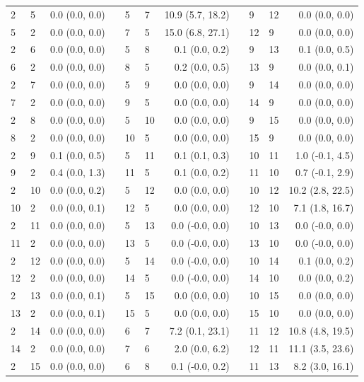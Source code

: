 \begin{xltabular}{\textwidth}{llrp{0.2cm}llrp{0.2cm}llr}
    2 & 5 & 0.0 (0.0, 0.0) & & 5 & 7 & 10.9 (5.7, 18.2) & & 9 & 12 & 0.0 (0.0, 0.0) \\
    5 & 2 & 0.0 (0.0, 0.0) & & 7 & 5 & 15.0 (6.8, 27.1) & & 12 & 9 & 0.0 (0.0, 0.0) \\
    2 & 6 & 0.0 (0.0, 0.0) & & 5 & 8 & 0.1 (0.0, 0.2) & & 9 & 13 & 0.1 (0.0, 0.5) \\
    6 & 2 & 0.0 (0.0, 0.0) & & 8 & 5 & 0.2 (0.0, 0.5) & & 13 & 9 & 0.0 (0.0, 0.1) \\
    2 & 7 & 0.0 (0.0, 0.0) & & 5 & 9 & 0.0 (0.0, 0.0) & & 9 & 14 & 0.0 (0.0, 0.0) \\
    7 & 2 & 0.0 (0.0, 0.0) & & 9 & 5 & 0.0 (0.0, 0.0) & & 14 & 9 & 0.0 (0.0, 0.0) \\
    2 & 8 & 0.0 (0.0, 0.0) & & 5 & 10 & 0.0 (0.0, 0.0) & & 9 & 15 & 0.0 (0.0, 0.0) \\
    8 & 2 & 0.0 (0.0, 0.0) & & 10 & 5 & 0.0 (0.0, 0.0) & & 15 & 9 & 0.0 (0.0, 0.0) \\
    2 & 9 & 0.1 (0.0, 0.5) & & 5 & 11 & 0.1 (0.1, 0.3) & & 10 & 11 & 1.0 (-0.1, 4.5) \\
    9 & 2 & 0.4 (0.0, 1.3) & & 11 & 5 & 0.1 (0.0, 0.2) & & 11 & 10 & 0.7 (-0.1, 2.9) \\
    2 & 10 & 0.0 (0.0, 0.2) & & 5 & 12 & 0.0 (0.0, 0.0) & & 10 & 12 & 10.2 (2.8, 22.5) \\
    10 & 2 & 0.0 (0.0, 0.1) & & 12 & 5 & 0.0 (0.0, 0.0) & & 12 & 10 & 7.1 (1.8, 16.7) \\
    2 & 11 & 0.0 (0.0, 0.0) & & 5 & 13 & 0.0 (-0.0, 0.0) & & 10 & 13 & 0.0 (-0.0, 0.0) \\
    11 & 2 & 0.0 (0.0, 0.0) & & 13 & 5 & 0.0 (-0.0, 0.0) & & 13 & 10 & 0.0 (-0.0, 0.0) \\
    2 & 12 & 0.0 (0.0, 0.0) & & 5 & 14 & 0.0 (-0.0, 0.0) & & 10 & 14 & 0.1 (0.0, 0.2) \\
    12 & 2 & 0.0 (0.0, 0.0) & & 14 & 5 & 0.0 (-0.0, 0.0) & & 14 & 10 & 0.0 (0.0, 0.2) \\
    2 & 13 & 0.0 (0.0, 0.1) & & 5 & 15 & 0.0 (0.0, 0.0) & & 10 & 15 & 0.0 (0.0, 0.0) \\
    13 & 2 & 0.0 (0.0, 0.1) & & 15 & 5 & 0.0 (0.0, 0.0) & & 15 & 10 & 0.0 (0.0, 0.0) \\
    2 & 14 & 0.0 (0.0, 0.0) & & 6 & 7 & 7.2 (0.1, 23.1) & & 11 & 12 & 10.8 (4.8, 19.5) \\
    14 & 2 & 0.0 (0.0, 0.0) & & 7 & 6 & 2.0 (0.0, 6.2) & & 12 & 11 & 11.1 (3.5, 23.6) \\
    2 & 15 & 0.0 (0.0, 0.0) & & 6 & 8 & 0.1 (-0.0, 0.2) & & 11 & 13 & 8.2 (3.0, 16.1) \\

\end{xltabular}

